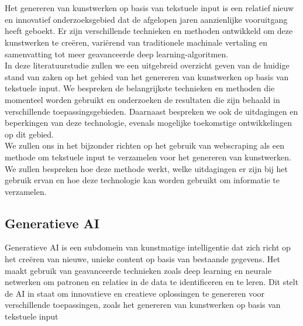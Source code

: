 \chapter{}%
\label{ch:stand-van-zaken}


Het genereren van kunstwerken op basis van tekstuele input is een relatief nieuw en innovatief onderzoeksgebied dat de afgelopen jaren aanzienlijke vooruitgang heeft geboekt. Er zijn verschillende technieken en methoden ontwikkeld om deze kunstwerken te creëren, variërend van traditionele machinale vertaling en samenvatting tot meer geavanceerde deep learning-algoritmen.\\

In deze literatuurstudie zullen we een uitgebreid overzicht geven van de huidige stand van zaken op het gebied van het genereren van kunstwerken op basis van tekstuele input. We bespreken de belangrijkste technieken en methoden die momenteel worden gebruikt en onderzoeken de resultaten die zijn behaald in verschillende toepassingsgebieden. Daarnaast bespreken we ook de uitdagingen en beperkingen van deze technologie, evenals mogelijke toekomstige ontwikkelingen op dit gebied.\\

We zullen ons in het bijzonder richten op het gebruik van webscraping als een methode om tekstuele input te verzamelen voor het genereren van kunstwerken. We zullen bespreken hoe deze methode werkt, welke uitdagingen er zijn bij het gebruik ervan en hoe deze technologie kan worden gebruikt om informatie te verzamelen.
\pagebreak


\section{Generatieve AI}

Generatieve AI is een subdomein van kunstmatige intelligentie dat zich richt op het creëren van nieuwe, unieke content op basis van bestaande gegevens. Het maakt gebruik van geavanceerde technieken zoals deep learning en neurale netwerken om patronen en relaties in de data te identificeren en te leren. Dit stelt de AI in staat om innovatieve en creatieve oplossingen te genereren voor verschillende toepassingen, zoals het genereren van kunstwerken op basis van tekstuele input \autocite{SonixAI2021}\\

